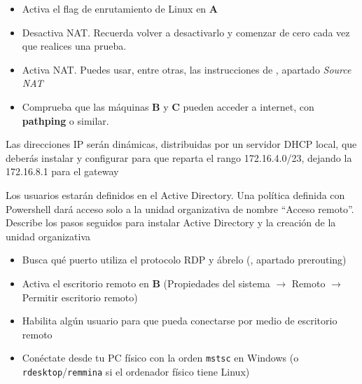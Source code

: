 \begin{homeworkProblem}
  \begin{itemize}
  \item Activa el flag de enrutamiento de Linux en \textbf{A}
  \item Desactiva NAT. Recuerda volver a desactivarlo y comenzar de cero cada vez que realices una prueba.

  \item Activa NAT. Puedes usar, entre otras, las instrucciones de , apartado \textit{Source NAT}
  \item Comprueba que las máquinas \textbf{B} y \textbf{C} pueden acceder a internet, con \textbf{pathping} o similar.
  \end{itemize}

          {\vspace{-1cm}\noindent\fontsize{.1}{.1}\selectfont Las direcciones IP serán dinámicas, distribuidas por un servidor DHCP local, que deberás instalar y configurar para que reparta el rango 172.16.4.0/23, dejando la 172.16.8.1 para el gateway\vspace{-.5cm}}
  
\end{homeworkProblem}

\begin{homeworkProblem}

          {\vspace{-1cm}\noindent\fontsize{.1}{.1}\selectfont Los usuarios estarán definidos en el Active Directory. Una política definida con Powershell dará acceso solo a la unidad organizativa de nombre ``Acceso remoto''. Describe los pasos seguidos para instalar Active Directory y la creación de la unidad organizativa \vspace{-.5cm}}

  \begin{itemize}
    
  \item Busca qué puerto utiliza el protocolo RDP y ábrelo (, apartado prerouting)
  \item Activa el escritorio remoto en \textbf{B} (Propiedades del sistema $\rightarrow$ Remoto $\rightarrow$ Permitir escritorio remoto)
    
  \item Habilita algún usuario para que pueda conectarse por medio de escritorio remoto
  \item Conéctate desde tu PC físico con la orden \texttt{mstsc} en  Windows (o \texttt{rdesktop}/\texttt{remmina} si el ordenador físico tiene Linux)
  \end{itemize}

  

\end{homeworkProblem}



